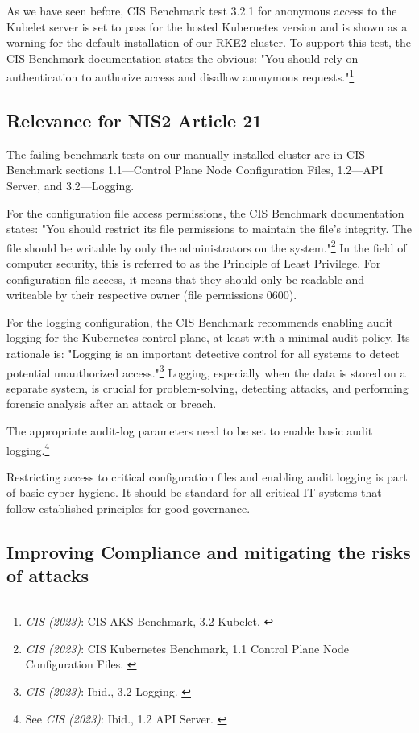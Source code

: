 As we have seen before, CIS Benchmark test 3.2.1 for anonymous access to the Kubelet server is set to pass for the hosted Kubernetes version and is shown as a warning for the default installation of our RKE2 cluster. To support this test, the CIS Benchmark documentation states the obvious: "You should rely on authentication to authorize access and disallow anonymous requests."\footnote{\textit{CIS (2023)}: CIS AKS Benchmark, 3.2 Kubelet. \cite{cisAks}}

\subsection{Relevance for NIS2 Article 21}

The failing benchmark tests on our manually installed cluster are in CIS Benchmark sections 1.1—Control Plane Node Configuration Files, 1.2—API Server, and 3.2—Logging.

For the configuration file access permissions, the CIS Benchmark documentation states: "You should restrict its file permissions to maintain the file's integrity. The file should be writable by only the administrators on the system."\footnote{\textit{CIS (2023)}: CIS Kubernetes Benchmark, 1.1 Control Plane Node Configuration Files. \cite{cisK8s}} In the field of computer security, this is referred to as the Principle of Least Privilege. For configuration file access, it means that they should only be readable and writeable by their respective owner (file permissions 0600).

For the logging configuration, the CIS Benchmark recommends enabling audit logging for the Kubernetes control plane, at least with a minimal audit policy. Its rationale is: "Logging is an important detective control for all systems to detect potential unauthorized access."\footnote{\textit{CIS (2023)}: Ibid., 3.2 Logging. \cite{cisK8s}} Logging, especially when the data is stored on a separate system, is crucial for problem-solving, detecting attacks, and performing forensic analysis after an attack or breach.

The appropriate audit-log parameters need to be set to enable basic audit logging.\footnote{See \textit{CIS (2023)}: Ibid., 1.2 API Server. \cite{cisK8s}}

Restricting access to critical configuration files and enabling audit logging is part of basic cyber hygiene. It should be standard for all critical IT systems that follow established principles for good governance.

\subsection{Improving Compliance and mitigating the risks of attacks}

